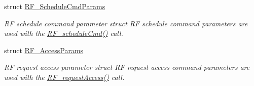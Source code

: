 \begin{DoxyCompactItemize}
struct \hyperlink{struct_r_f___schedule_cmd_params}{R\+F\+\_\+\+Schedule\+Cmd\+Params}
\begin{DoxyCompactList}\small\item\em R\+F schedule command parameter struct R\+F schedule command parameters are used with the \hyperlink{_r_f_8h_a5e7f25943b5f3942bf4c09cb87f9aa76}{R\+F\+\_\+schedule\+Cmd()} call. \end{DoxyCompactList}\item 
struct \hyperlink{struct_r_f___access_params}{R\+F\+\_\+\+Access\+Params}
\begin{DoxyCompactList}\small\item\em R\+F request access parameter struct R\+F request access command parameters are used with the \hyperlink{_r_f_8h_a40a5506c05a11a3cd9d379cedad5b5d0}{R\+F\+\_\+request\+Access()} call. \end{DoxyCompactList}\end{DoxyCompactItemize}
